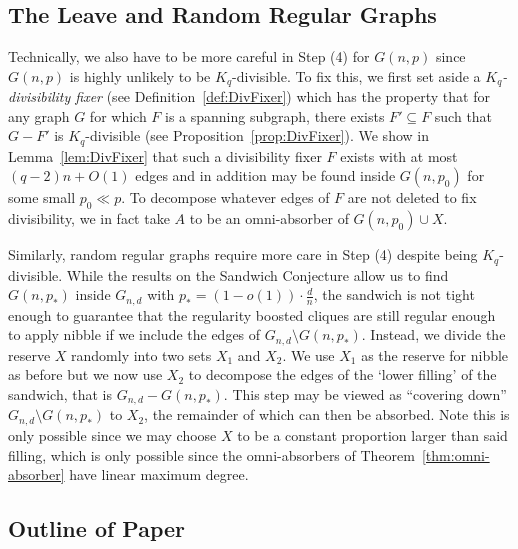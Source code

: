 \documentclass[11pt]{article}
\numberwithin{equation}{section}
\newcounter{i}
\theoremstyle{plain}
\theoremstyle{plain} %
\theoremstyle{definition}
\begin{document}
\subsection{The Leave and Random Regular Graphs}

Technically, we also have to be more careful in Step (4) for $G(n,p)$ since $G(n,p)$ is highly unlikely to be $K_q$-divisible. To fix this, we first set aside a \emph{$K_q$-divisibility fixer} (see Definition~\ref{def:DivFixer}) which has the property that for any graph $G$ for which $F$ is a spanning subgraph, there exists $F'\subseteq F$ such that $G-F'$ is $K_q$-divisible (see Proposition~\ref{prop:DivFixer}). We show in Lemma~\ref{lem:DivFixer} that such a divisibility fixer $F$ exists with at most $(q - 2)n + O(1)$ edges and in addition may be found inside $G(n,p_0)$ for some small $p_0 \ll p$. To decompose whatever edges of $F$ are not deleted to fix divisibility, we in fact take $A$ to be an omni-absorber of $G(n,p_0)\cup X$. 

Similarly, random regular graphs require more care in Step (4) despite being $K_q$-divisible. While the results on the Sandwich Conjecture allow us to find $G(n,p_*)$ inside $G_{n,d}$ with $p_* = (1-o(1))\cdot \frac{d}{n}$, the sandwich is not tight enough to guarantee that the regularity boosted cliques are still regular enough to apply nibble if we include the edges of $G_{n,d}\setminus G(n,p_*)$. Instead, we divide the reserve $X$ randomly into two sets $X_1$ and $X_2$. We use $X_1$ as the reserve for nibble as before but we now use $X_2$ to decompose the edges of the `lower filling' of the sandwich, that is $G_{n,d} - G(n,p_*)$. This step may be viewed as ``covering down'' $G_{n,d}\setminus G(n,p_*)$ to $X_2$, the remainder of which can then be absorbed.  Note this is only possible since we may choose $X$ to be a constant proportion larger than said filling, which is only possible since the omni-absorbers of Theorem~\ref{thm:omni-absorber} have linear maximum degree.

\subsection{Outline of Paper}\label{ss:Outline}

\end{document}
